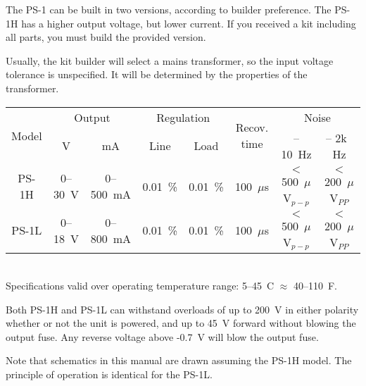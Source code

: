 The PS-1 can be built in two versions, according to builder preference. The
PS-1H has a higher output voltage, but lower current. If you received a kit
including all parts, you must build the provided version.

Usually, the kit builder will select a mains transformer, so the input voltage
tolerance is unspecified. It will be determined by the properties of the
transformer.

\vspace{25mm}

\begin{center}
\begin{tabular}{|c|c|c|c|c|c|c|c|}
    \hline
    \multirow{2}{*}{\sc Model} & \multicolumn{2}{|c|}{\sc Output}
        & \multicolumn{2}{|c|}{\sc Regulation}
        & \multirow{2}{*}{\begin{minipage}[c]{1.5cm} \centering \sc Recov. time\end{minipage}}
    & \multicolumn{2}{|c|}{\sc Noise} \\ \cline{2-5} \cline{7-8}
        & \sc V & \sc mA & \sc Line & \sc Load & & \sc 0.1 -- 10~Hz & \sc 25 -- 2k~ Hz\\ \hline
    \hline

    PS-1H & 0--30~V & 0--500~mA & 0.01~\% & 0.01~\% & 100~$\mu$s &
        $<$ 500~$\mu $V$_{p-p}$ & $<$ 200~$\mu $V$_{PP}$ \\ \hline

    PS-1L & 0--18~V & 0--800~mA & 0.01~\% & 0.01~\% & 100~$\mu$s &
        $<$ 500~$\mu $V$_{p-p}$ & $<$ 200~$\mu $V$_{PP}$ \\ \hline

\end{tabular}

\ \\
Specifications valid over operating temperature range: 5--45~\dg C $\approx$ 40--110~\dg F.
\end{center}

Both PS-1H and PS-1L can withstand overloads of up to 200~V in either polarity
whether or not the unit is powered, and up to 45~V forward without blowing the
output fuse. Any reverse voltage above -0.7~V will blow the output fuse.

Note that schematics in this manual are drawn assuming the PS-1H model. The
principle of operation is identical for the PS-1L.
